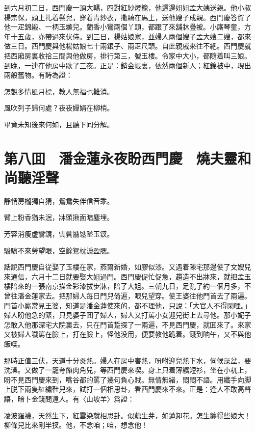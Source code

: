 到六月初二日，西門慶一頂大轎，四對紅紗燈籠，他這邊姐姐孟大姨送親。他小叔楊宗保，頭上扎着髻兒，穿着青紗衣，撒騎在馬上，送他嫂子成親。西門慶答賀了他一疋錦緞、一柄玉縧兒。蘭香小鸞兩個丫頭，都跟了來舖牀疊被。小廝琴童，方年十五歲，亦帶過來伏侍。到三日，楊姑娘家，並婦人兩個嫂子孟大嫂二嫂，都來做三日。西門慶與他楊姑娘七十兩銀子、兩疋尺頭。自此親戚來往不絶。西門慶就把西廂房裏收拾三間與他做房，排行第三，號玉樓。令家中大小，都隨着叫三娘。到晚，一連在他房中歇了三夜。正是：銷金帳裏，依然兩個新人；紅錦被中，現出兩般舊物。有詩為證：

怎覩多情風月標，教人無福也難消。

風吹列子歸何處？夜夜嬋娟在柳梢。

畢竟未知後來何如，且聽下囘分解。

\chapter*{第八囬　潘金蓮永夜盼西門慶　燒夫靈和尚聽淫聲}

靜悄房櫳獨自猜，鴛鴦失伴信音乖。

臂上粉香猶未泯，牀頭揪面暗塵埋。

芳容消瘦虚鸞鏡，雲鬢鬅鬆墜玉釵。

駿驥不來勞望眼，空餘鴛枕淚盈腮。

話說西門慶自従娶了玉樓在家，燕爾新婚，如膠似漆。又遇着陳宅那邊使了文嫂兒來通信，六月十二日就要娶大姐過門。西門慶促忙促急，趲造不出牀來，就把孟玉樓陪來的一張南京描金彩漆拔步牀，陪了大姐。三朝九日，足亂了約一個月多，不曾往潘金蓮家去。把那婦人每日門兒倚遍，眼兒望穿。使王婆往他門首去了兩遍。門首小廝常見王婆，知道是潘金蓮使來的，都不理他，只說：「大官人不得閑哩。」婦人盼他急的緊，只見婆子囬了婦人，婦人又打罵小女迎兒街上去尋他。那小妮子怎敢入他那深宅大院裏去，只在門首踅探了一兩遍，不見西門慶，就囬來了。來家又被婦人噦罵在臉上，打在臉上，怪他没用，便要教他跪着。餓到晌午，又不與他飯喫。

那時正值三伏，天道十分炎熱。婦人在房中害熱，吩咐迎兒熱下水，伺候澡盆，要洗澡。又做了一籠夸餡肉角兒，等西門慶來喫。身上只着薄纊短衫，坐在小杌上，盼不見西門慶來到，嘴谷都的罵了幾句負心賊。無情無緒，悶悶不語。用纖手向脚上脱下兩隻紅繡鞋兒來，試打一個相思卦，看西門慶來不來。正是：逢人不敢高聲語，暗卜金錢問遠人。有〈山坡羊〉爲證：

凌波羅襪，天然生下，紅雲染就相思卦。似藕生芽，如蓮卸花。怎生纏得些娘大！柳條兒比來剛半扠。他，不念咱；咱，想念他！

